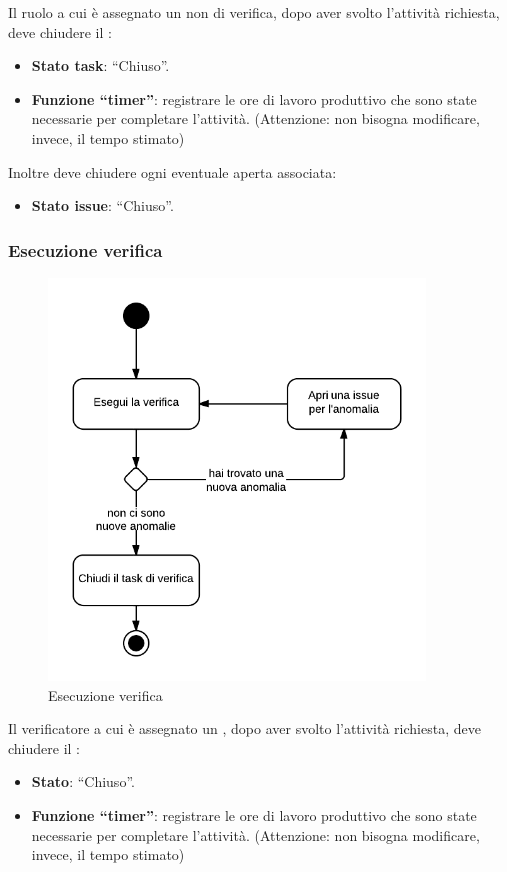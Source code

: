 Il ruolo a cui è assegnato un  non di verifica, dopo aver svolto l'attività richiesta, deve chiudere il :
\begin{itemize}
 \item \textbf{Stato task}: ``Chiuso''.
 \item \textbf{Funzione ``timer''}: registrare le ore di lavoro produttivo che sono state necessarie per completare l'attività. (Attenzione: non bisogna modificare, invece, il tempo stimato)
\end{itemize}

Inoltre deve chiudere ogni eventuale  aperta associata:
\begin{itemize}
 \item \textbf{Stato issue}: ``Chiuso''.
\end{itemize}

\subsubsection{Esecuzione verifica}

\begin{figure}[H]
    \centering
    \includegraphics[width=10cm]{uml-processi/esecuzione_verifica.png}
    \caption{Esecuzione verifica}
\end{figure}

Il verificatore a cui è assegnato un , dopo aver svolto l'attività richiesta, deve chiudere il :
\begin{itemize}
 \item \textbf{Stato}: ``Chiuso''.
 \item \textbf{Funzione ``timer''}: registrare le ore di lavoro produttivo che sono state necessarie per completare l'attività. (Attenzione: non bisogna modificare, invece, il tempo stimato)
\end{itemize}

